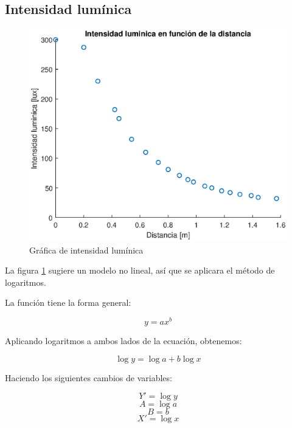 \documentclass[letter,11pt]{article}
\begin{document}
\subsection{Intensidad lumínica}
\begin{figure}[!h]
\centering
\includegraphics[scale=1.00]{eps/3.1.1.eps}
\caption{Gráfica de intensidad lumínica}
\label{practica41}
\end{figure}

La figura \ref{practica41} sugiere un modelo no lineal, así que se aplicara el
método de logaritmos.

La función tiene la forma general:

\begin{equation*}
    y = a x^b
\end{equation*}

Aplicando logaritmos a ambos lados de la ecuación, obtenemos:

\begin{equation*}
    \log y = \log a + b \log x
\end{equation*}

Haciendo los siguientes cambios de variables:

\begin{equation*}
    Y' = \log y
\end{equation*}
\begin{equation*}
    A = \log a
\end{equation*}
\begin{equation*}
    B = b
\end{equation*}
\begin{equation*}
    X' = \log x
\end{equation*}
\end{document}
